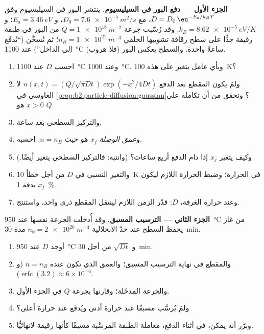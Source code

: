 \begin{problem}\label{pb:b2:particle-diffusion:1}
\textbf{الجزء الأول --- دفع البور في السيليسيوم.}
ينتشر البور في السيليسيوم وفق $D = D_0\,\eu^{-E_{\text{a}}/k_BT}$، مع $D_0 =
\qty{7.6e-5}{m^2/s}$، و $E_{\text{a}} = \qty{3.46}{eV}$؛ و $k_B =
\qty{8.62e-5}{eV/K}$. وقد رُسّبت جرعة $Q = \qty{1e18}{m^{-2}}$ من البور
في طبقة رقيقة جدًّا على سطح رقاقة تشويبها
الخلفي $n_B = \qty{1e21}{m^{-3}}$؛ ثم تُسخَّن
(``تُدفَع إلى الداخل'') عند \qty{1100}{\celsius} ساعةً واحدة. والسطح
يعكس البور (فلا هروب).
\begin{enumerate}
  \item احسب $D$ عند \qty{1100}{\celsius} وعند \qty{1000}{\celsius}.
        وبأي عامل يتغير على هذه \qty{100}{K}؟
  \item ولمَ يكون المقطع بعد الدفع $n(x,t) = (Q/\sqrt{\pi
        Dt})\exp(-x^2/4Dt)$ لا الغاوسي في
        \cref{prop:b2:particle-diffusion:gaussian}؟ وتحقق من أن
        تكامله على $x > 0$ هو $Q$.
  \item والتركيز السطحي بعد ساعة.
  \item و\emph{عمق الوصلة} $x_j$ هو حيث $n = n_B$: احسبه.
  \item وكيف يتغير $x_j$ إذا دام الدفع أربع ساعات؟
        (وانتبه: فالتركيز السطحي يتغير أيضًا.)
  \item والتغير النسبي في $D$ من أجل خطأ \qty{10}{K} في الحرارة؛
        وضبط الحرارة اللازم ليكون $x_j$ بدقة \qty{1}{\%}.
  \item وعند حرارة الغرفة، $D$: قدّر الزمن اللازم لينتقل المقطع
         ذري واحد، واستنتج.
\end{enumerate}

\textbf{الجزء الثاني --- الترسيب المسبق.}
وقد أُدخلت الجرعة نفسها عند \qty{950}{\celsius} من غاز يحفظ
السطح عند حدّ الانحلالية $n_0 = \qty{2e26}{m^{-3}}$ مدة
\qty{30}{min}.
\begin{enumerate}[resume]
  \item أوجد $D$ عند \qty{950}{\celsius} و $\sqrt{Dt}$ من أجل \qty{30}{min}.
  \item والمقطع في نهاية الترسيب المسبق؛ والعمق الذي تكون عنده $n =
        n_B$ (و $\operatorname{erfc}(3.2) \approx 6 \times 10^{-6}$).
  \item والجرعة المدخَلة؛ وقارنها بجرعة $Q$ في الجزء الأول.
  \item ولمَ يُرسَّب مسبقًا عند حرارة أدنى ويُدفَع عند
        حرارة أعلى؟
  \item وبرّر أنه يمكن، في أثناء الدفع، معاملة الطبقة المرسَّبة
        مسبقًا كأنها رقيقة لانهائيًّا.
\end{enumerate}


\end{problem}
